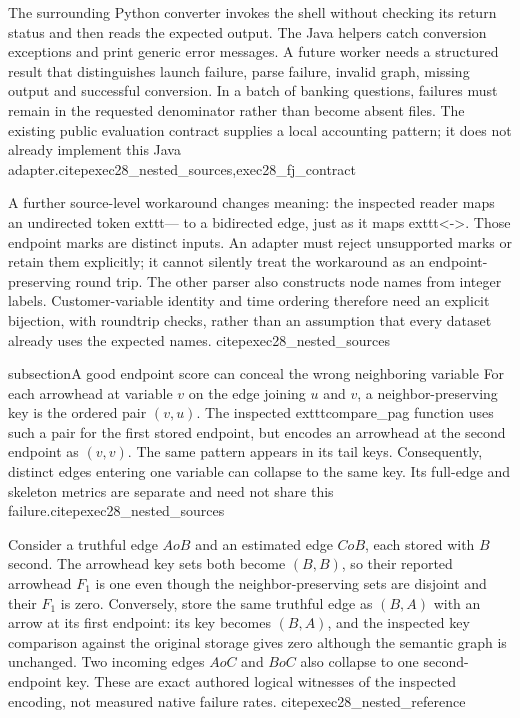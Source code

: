 The surrounding Python converter invokes the shell without checking its return
status and then reads the expected output. The Java helpers catch conversion
exceptions and print generic error messages. A future worker needs a structured
result that distinguishes launch failure, parse failure, invalid graph, missing
output and successful conversion. In a batch of banking questions, failures
must remain in the requested denominator rather than become absent files.
The existing public evaluation contract supplies a local accounting pattern;
it does not already implement this Java adapter.citep{exec28_nested_sources,exec28_fj_contract}

A further source-level workaround changes meaning: the inspected reader maps
an undirected token 	exttt{---} to a bidirected edge, just as it maps
	exttt{<->}. Those endpoint marks are distinct inputs. An adapter must reject
unsupported marks or retain them explicitly; it cannot silently treat the
workaround as an endpoint-preserving round trip. The other parser also
constructs node names from integer labels. Customer-variable identity and
time ordering therefore need an explicit bijection, with roundtrip checks,
rather than an assumption that every dataset already uses the expected names.
citep{exec28_nested_sources}

subsection{A good endpoint score can conceal the wrong neighboring variable}
For each arrowhead at variable $v$ on the edge joining $u$ and $v$, a
neighbor-preserving key is the ordered pair $(v,u)$. The inspected
	exttt{compare_pag} function uses such a pair for the first stored endpoint,
but encodes an arrowhead at the second endpoint as $(v,v)$. The same pattern
appears in its tail keys. Consequently, distinct edges entering one variable
can collapse to the same key. Its full-edge and skeleton metrics are separate
and need not share this failure.citep{exec28_nested_sources}

Consider a truthful edge $A	o B$ and an estimated edge $C	o B$, each stored
with $B$ second. The arrowhead key sets both become ${(B,B)}$, so their
reported arrowhead $F_1$ is one even though the neighbor-preserving sets are
disjoint and their $F_1$ is zero. Conversely, store the same truthful edge as
$(B,A)$ with an arrow at its first endpoint: its key becomes $(B,A)$, and
the inspected key comparison against the original storage gives zero although
the semantic graph is unchanged. Two incoming edges $A	o C$ and $B	o C$
also collapse to one second-endpoint key. These are exact authored logical
witnesses of the inspected encoding, not measured native failure rates.
citep{exec28_nested_reference}

